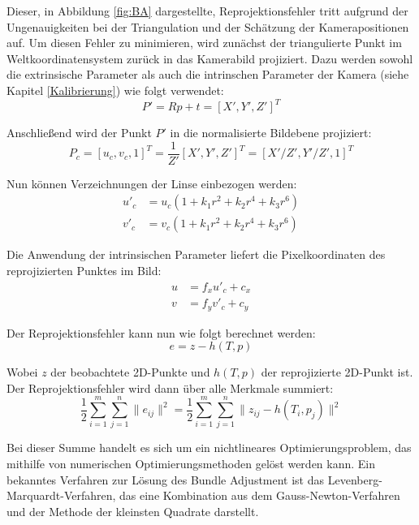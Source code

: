 Dieser, in Abbildung \ref{fig:BA} dargestellte, Reprojektionsfehler tritt aufgrund der Ungenauigkeiten bei der Triangulation und der Schätzung der Kamerapositionen auf. Um diesen Fehler zu minimieren, wird zunächst der triangulierte Punkt im Weltkoordinatensystem zurück in das Kamerabild projiziert. Dazu werden sowohl die extrinsische Parameter als auch die intrinschen Parameter der Kamera (siehe Kapitel \ref{Kalibrierung}) wie folgt verwendet:
\begin{equation}
    P' = Rp+t = [X', Y', Z']^T
\end{equation}

Anschließend wird der Punkt \( P' \) in die normalisierte Bildebene projiziert:
\begin{equation}
    P_c = [u_c, v_c, 1]^T = \frac{1}{Z'}[X', Y', Z']^T = [X'/Z', Y'/Z', 1]^T
\end{equation}

Nun können Verzeichnungen der Linse einbezogen werden:
\begin{equation}
    \begin{aligned}
        u'_c &= u_c(1 + k_1r^2 + k_2r^4 + k_3r^6) \\
        v'_c &= v_c(1 + k_1r^2 + k_2r^4 + k_3r^6)
    \end{aligned}
\end{equation}

Die Anwendung der intrinsischen Parameter liefert die Pixelkoordinaten des reprojizierten Punktes im Bild:
\begin{equation}
    \begin{aligned}
        u &= f_xu'_c + c_x \\
        v &= f_yv'_c + c_y
    \end{aligned}
\end{equation}

Der Reprojektionsfehler kann nun wie folgt berechnet werden:
\begin{equation}
    e = z - h(T,p)
\end{equation}

Wobei \( z \) der beobachtete 2D-Punkte und \( h(T,p) \) der reprojizierte 2D-Punkt ist. Der Reprojektionsfehler wird dann über alle Merkmale summiert:
\begin{equation}
    \frac{1}{2} \sum_{i=1}^{m} \sum_{j=1}^{n} \| e_{ij} \|^2 = \frac{1}{2} \sum_{i=1}^{m} \sum_{j=1}^{n} \| z_{ij} - h(T_i, p_j) \|^2
\end{equation}

Bei dieser Summe handelt es sich um ein nichtlineares Optimierungsproblem, das mithilfe von numerischen Optimierungsmethoden gelöst werden kann. Ein bekanntes Verfahren zur Lösung des Bundle Adjustment ist das Levenberg-Marquardt-Verfahren, das eine Kombination aus dem Gauss-Newton-Verfahren und der Methode der kleinsten Quadrate darstellt.

